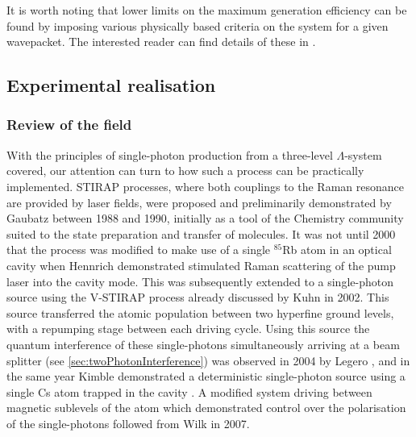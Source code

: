 \documentclass[../Thesis-IJspeert.tex]{subfiles}
\begin{document}
It is worth noting that lower limits on the maximum generation efficiency can be found by imposing various physically based criteria on the system for a given wavepacket.  The interested reader can find details of these in \cite{kuhn09}.

\subsection{Experimental realisation}
\label{sec:experimentalRealisation}

\subsubsection{Review of the field}
\label{sec:reviewOfTheField}

With the principles of single-photon production from a three-level $\Lambda$-system covered, our attention can turn to how such a process can be practically implemented.  STIRAP processes, where both couplings to the Raman resonance are provided by laser fields, were proposed and preliminarily demonstrated by Gaubatz \etal{} \cite{gaubatz88,gaubatz90} between 1988 and 1990, initially as a tool of the Chemistry community suited to the state preparation and transfer of molecules.  It was not until 2000 that the process was modified to make use of a single $^{85}$Rb atom in an optical cavity when Hennrich \etal{} \cite{hennrich00} demonstrated stimulated Raman scattering of the pump laser into the cavity mode.  This was subsequently extended to a single-photon source using the V-STIRAP process already discussed by Kuhn \etal{} \cite{kuhn02} in 2002.  This source transferred the atomic population between two hyperfine ground levels, with a repumping stage between each driving cycle.  Using this source the quantum interference of these single-photons simultaneously arriving at a beam splitter (see \cref{sec:twoPhotonInterference}) was observed in 2004 by Legero \etal{} \cite{legero04}, and in the same year Kimble \etal{} demonstrated a deterministic single-photon source using a single Cs atom trapped in the cavity \cite{mckeever04}.  A modified system driving between magnetic sublevels of the atom which demonstrated control over the polarisation of the single-photons followed from Wilk \etal{} \cite{wilk07} in 2007.
\end{document}
